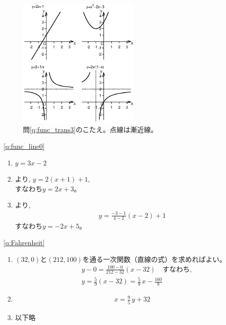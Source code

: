 \begin{figure}[h]
    \centering
      \includegraphics[width=6cm]{2x_plus_1_etc.eps}
      \caption{問\ref{q:func_trans3}のこたえ。点線は漸近線。\label{2x_plus_1_etc}}
\end{figure}
\mv

\ref{q:func_line0} 
\begin{enumerate}
\item $y=3x-2$
\item {}より, $y=2(x+1)+1$, \\すなわち$y=2x+3$。
\item {}より, 
\begin{eqnarray}y=\frac{-3-1}{4-2}(x-2)+1\end{eqnarray}
すなわち$y=-2x+5$。
\end{enumerate}
\mv

\ref{q:Fahrenheit} 
\begin{enumerate}
\item $(32, 0)$と$(212, 100)$を通る一次関数（直線の式）を求めればよい。
\begin{eqnarray*}
&&y-0=\frac{100-0}{212-32}(x-32)\quad\text{すなわち, }\\
&&y=\frac{5}{9}(x-32)=\frac{5}{9}\,x-\frac{160}{9}
\end{eqnarray*}
\item
\begin{eqnarray*}
x=\frac{9}{5}\,y+32
\end{eqnarray*}
\item 以下略
\end{enumerate}
\mv



